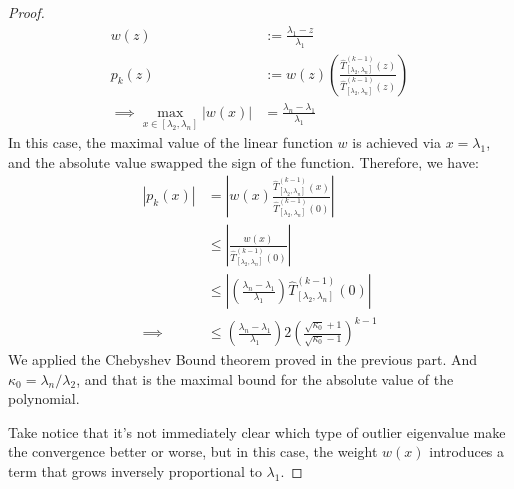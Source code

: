 \documentclass[]{article}
\theoremstyle{definition}
\begin{document}
            \begin{proof}
                \begin{align}
                    w(z) &:=  \frac{\lambda_1 - z}{\lambda_1} 
                    \\
                    p_k(z) &:= w(z)\left(
                        \frac{\hat{T}_{[\lambda_2, \lambda_n]}^{(k - 1)}(z)}
                        {
                            \hat{T}_{[\lambda_2, \lambda_n]}^{(k - 1)}(z)
                        }
                    \right)
                    \\\implies
                    \max_{x\in[\lambda_2, \lambda_n]} |w(x)| &=
                    \frac{\lambda_n - \lambda_1}{\lambda_1}
                \end{align}
                In this case, the maximal value of the linear function $w$ is achieved via $x = \lambda_1$, and the absolute value swapped the sign of the function. Therefore, we have: 
                \begin{align}
                    |p_k(x)| &= 
                    \left|
                        w(x) 
                        \frac{\hat{T}_{[\lambda_2, \lambda_n]}^{(k - 1)}(x)}
                        {
                            \hat{T}_{[\lambda_2, \lambda_n]}^{(k - 1)}(0)
                        }
                    \right|
                    \\
                    &\le 
                    \left|
                        \frac{w(x)}{\hat{T}_{[\lambda_2, \lambda_n]}^{(k - 1)}(0)}
                    \right|
                    \\
                    & \le
                    \left| 
                        \left(
                            \frac{\lambda_n - \lambda_1}{\lambda_1}
                        \right)
                        \hat{T}_{[\lambda_2, \lambda_n]}^{(k - 1)}(0)
                    \right|
                    \\
                    \implies 
                    & \le   
                    \left(
                        \frac{\lambda_n - \lambda_1}{\lambda_1}
                    \right)
                    2\left(
                        \frac{\sqrt{\kappa_0} + 1}{\sqrt{\kappa_0} - 1}
                    \right)^{k - 1}
                \end{align}
                We applied the Chebyshev Bound theorem proved in the previous part. And $\kappa_0 = \lambda_n/\lambda_2$, and that is the maximal bound for the absolute value of the polynomial.
                \par
                Take notice that it's not immediately clear which type of outlier eigenvalue make the convergence better or worse, but in this case, the weight $w(x)$ introduces a term that grows inversely proportional to $\lambda_1$. 
            \end{proof}
\end{document}

